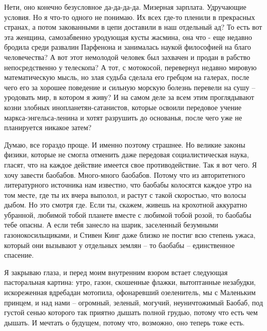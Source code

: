 Нети, оно конечно безусловное да-да-да-да. Мизерная зарплата. Удручающие
условия. Но я что-то одного не понимаю. Их всех где-то пленили в прекрасных
странах, а потом закованными в цепи доставили в наш отдельный ад? То есть вот
эта женщина, самозабвенно уродующая кусты жасмина, она что - еще недавно
бродила среди развалин Парфенона и занималась наукой философией на благо
человечества? А вот этот немолодой человек был захвачен и продан в рабство
непосредственно у телескопа? А тот, с мотокосой, перевернул недавно мировую
математическую мысль, но злая судьба сделала его гребцом на галерах, после чего
его за хорошее поведение и сильную морскую болезнь перевели на сушу – уродовать
мир, в котором я живу? И на самом деле за всем этим проглядывают козни злобных
инопланетян-сатанистов, которые освоили передовое учение маркса-энгельса-ленина
и хотят разрушить до основанья, после чего уже не планируется никакое затем?

Думаю, все гораздо проще. И именно поэтому страшнее. Но великие законы физики,
которые не смогла отменить даже передовая социалистическая наука, гласят, что
на каждое действие имеется свое противодействие. Так я вот чего. Я хочу завести
баобабов. Много-много баобабов. Потому что из авторитетного литературного
источника нам известно, что баобабы колосятся каждое утро на том месте, где ты
их вчера выполол, и растут с такой скоростью, что волосы дыбом. Но это смотря
где. Если ты, скажем, живешь на крохотной аккуратно убранной, любимой тобой
планете вместе с любимой тобой розой, то баобабы тебе опасны. А если тебя
занесло на шарик, заселенный безумными газонокосильщиками, и Стивен Кинг даже
близко не постиг всю степень ужаса, который они вызывают у отдельных землян –
то баобабы – единственное спасение.

Я закрываю глаза, и перед моим внутренним взором встает следующая пасторальная
картина: утро, газон, скошенные флажки, вытоптанные незабудки, искореженная
вдребадан мотопила, офонаревший озеленитель, мы с Маленьким принцем, и над нами
– огромный, зеленый, могучий, неуничтожимый Баобаб, под густой сенью которого
так приятно дышать полной грудью, потому что есть чем дышать. И мечтать о
будущем, потому что, возможно, оно теперь тоже есть.

